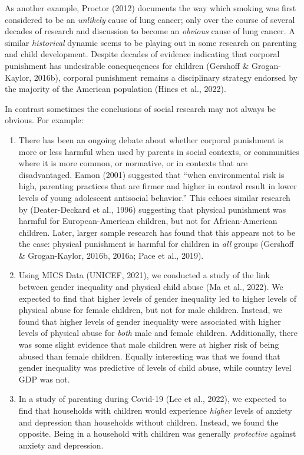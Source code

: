 \documentclass[
  letterpaper,
  DIV=11,
  numbers=noendperiod]{scrreprt}
\providecommand{\tightlist}{%
  \setlength{\itemsep}{0pt}\setlength{\parskip}{0pt}}\usepackage{longtable,booktabs,array}
\begin{document}
As another example, Proctor (2012) documents the way which smoking was
first considered to be an \emph{unlikely} cause of lung cancer; only
over the course of several decades of research and discussion to become
an \emph{obvious} cause of lung cancer. A similar \emph{historical}
dynamic seems to be playing out in some research on parenting and child
development. Despite decades of evidence indicating that corporal
punishment has undesirable conequeqences for children (Gershoff \&
Grogan-Kaylor, 2016b), corporal punishment remains a disciplinary
strategy endorsed by the majority of the American population (Hines et
al., 2022).

In contrast sometimes the conclusions of social research may not always
be obvious. For example:

\begin{enumerate}
\def\labelenumi{\arabic{enumi}.}
\tightlist
\item
  There has been an ongoing debate about whether corporal punishment is
  more or less harmful when used by parents in social contexts, or
  communities where it is more common, or normative, or in contexts that
  are disadvantaged. Eamon (2001) suggested that ``when environmental
  risk is high, parenting practices that are firmer and higher in
  control result in lower levels of young adolescent antisocial
  behavior.'' This echoes similar research by (Deater-Deckard et al.,
  1996) suggesting that physical punishment was harmful for
  European-American children, but not for African-American children.
  Later, larger sample research has found that this appears not to be
  the case: physical punishment is harmful for children in \emph{all}
  groups (Gershoff \& Grogan-Kaylor, 2016b, 2016a; Pace et al., 2019).
\item
  Using MICS Data (UNICEF, 2021), we conducted a study of the link
  between gender inequality and physical child abuse (Ma et al., 2022).
  We expected to find that higher levels of gender inequality led to
  higher levels of physical abuse for female children, but not for male
  children. Instead, we found that higher levels of gender inequality
  were associated with higher levels of physical abuse for \emph{both}
  male and female children. Additionally, there was some slight evidence
  that male children were at higher risk of being abused than female
  children. Equally interesting was that we found that gender inequality
  was predictive of levels of child abuse, while country level GDP was
  not.
\item
  In a study of parenting during Covid-19 (Lee et al., 2022), we
  expected to find that households with children would experience
  \emph{higher} levels of anxiety and depression than households without
  children. Instead, we found the opposite. Being in a household with
  children was generally \emph{protective} against anxiety and
  depression.
\end{enumerate}
\end{document}
